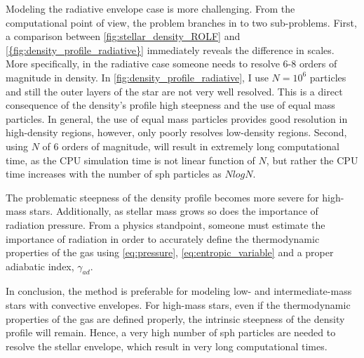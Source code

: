 Modeling the radiative envelope case is more challenging. From the computational point of view, the problem branches in to two sub-problems. First, a comparison between \cref{fig:stellar_density_ROLF} and \cref{{fig:density_profile_radiative}} immediately reveals the difference in scales. More specifically, in the radiative case someone needs to resolve 6-8 orders of magnitude in density. In \cref{fig:density_profile_radiative}, I use $N=10^6$ particles and still the outer layers of the star are not very well resolved. This is a direct consequence of the density's profile high steepness and the use of equal mass particles. In general, the use of equal mass particles provides good resolution in high-density regions, however, only poorly resolves low-density regions. Second, using $N$ of 6 orders of magnitude, will result in extremely long computational time, as the CPU simulation time is not linear function of $N$, but rather the CPU time increases with the number of \ac{sph} particles as $NlogN$.

The problematic steepness of the density profile becomes more severe for high-mass stars. Additionally, as stellar mass grows so does the importance of radiation pressure. From a physics standpoint, someone must estimate the importance of radiation in order to accurately define the thermodynamic properties of the gas using \cref{eq:pressure}, \cref{eq:entropic_variable} and a proper adiabatic index, $\gamma_{ad}$.

In conclusion, the method is preferable for modeling low- and intermediate-mass stars with convective envelopes. For high-mass stars, even if the thermodynamic properties of the gas are defined properly, the intrinsic steepness of the density profile will remain.  Hence, a very high number of \ac{sph} particles are needed to resolve the stellar envelope, which result in very long computational times. 

